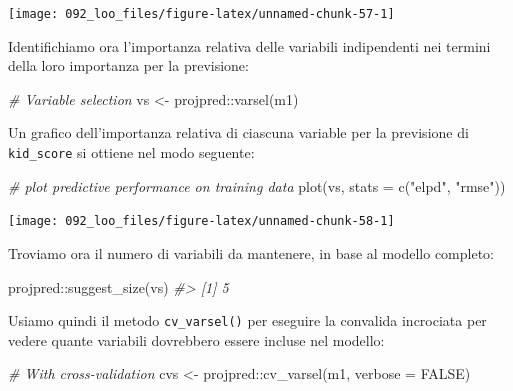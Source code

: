 \documentclass[
  10pt,
  italian,
  a4paper,
  extrafontsizes,onecolumn,openright
  ]{memoir}
\newenvironment{Shaded}{\begin{snugshade}}{\end{snugshade}}
\newcommand{\AttributeTok}[1]{\textcolor[rgb]{0.77,0.63,0.00}{#1}}
\newcommand{\CommentTok}[1]{\textcolor[rgb]{0.56,0.35,0.01}{\textit{#1}}}
\newcommand{\ConstantTok}[1]{\textcolor[rgb]{0.00,0.00,0.00}{#1}}
\newcommand{\FunctionTok}[1]{\textcolor[rgb]{0.00,0.00,0.00}{#1}}
\newcommand{\NormalTok}[1]{#1}
\newcommand{\OtherTok}[1]{\textcolor[rgb]{0.56,0.35,0.01}{#1}}
\newcommand{\SpecialCharTok}[1]{\textcolor[rgb]{0.00,0.00,0.00}{#1}}
\newcommand{\StringTok}[1]{\textcolor[rgb]{0.31,0.60,0.02}{#1}}
\newlength{\rf}
\theoremstyle{definition}
\theoremstyle{definition}
\theoremstyle{definition}
\theoremstyle{definition}
\theoremstyle{remark}
\begin{document}
\begin{center}\texttt{[image: 092\_loo\_files/figure-latex/unnamed-chunk-57-1]} \end{center}

\noindent
Identifichiamo ora l'importanza relativa delle variabili indipendenti nei termini della loro importanza per la previsione:

\begin{Shaded}
\begin{Highlighting}[]
\CommentTok{\# Variable selection}
\NormalTok{vs }\OtherTok{\textless{}{-}}\NormalTok{ projpred}\SpecialCharTok{::}\FunctionTok{varsel}\NormalTok{(m1)}
\end{Highlighting}
\end{Shaded}

\noindent
Un grafico dell'importanza relativa di ciascuna variable per la previsione di \texttt{kid\_score} si ottiene nel modo seguente:

\begin{Shaded}
\begin{Highlighting}[]
\CommentTok{\# plot predictive performance on training data}
\FunctionTok{plot}\NormalTok{(vs, }\AttributeTok{stats =} \FunctionTok{c}\NormalTok{(}\StringTok{"elpd"}\NormalTok{, }\StringTok{"rmse"}\NormalTok{))}
\end{Highlighting}
\end{Shaded}

\begin{center}\texttt{[image: 092\_loo\_files/figure-latex/unnamed-chunk-58-1]} \end{center}

\noindent
Troviamo ora il numero di variabili da mantenere, in base al modello completo:

\begin{Shaded}
\begin{Highlighting}[]
\NormalTok{projpred}\SpecialCharTok{::}\FunctionTok{suggest\_size}\NormalTok{(vs)}
\CommentTok{\#\textgreater{} [1] 5}
\end{Highlighting}
\end{Shaded}

\noindent
Usiamo quindi il metodo \texttt{cv\_varsel()} per eseguire la convalida incrociata per vedere quante variabili dovrebbero essere incluse nel modello:

\begin{Shaded}
\begin{Highlighting}[]
\CommentTok{\# With cross{-}validation}
\NormalTok{cvs }\OtherTok{\textless{}{-}}\NormalTok{ projpred}\SpecialCharTok{::}\FunctionTok{cv\_varsel}\NormalTok{(m1, }\AttributeTok{verbose =} \ConstantTok{FALSE}\NormalTok{)}
\end{Highlighting}
\end{Shaded}
\end{document}
